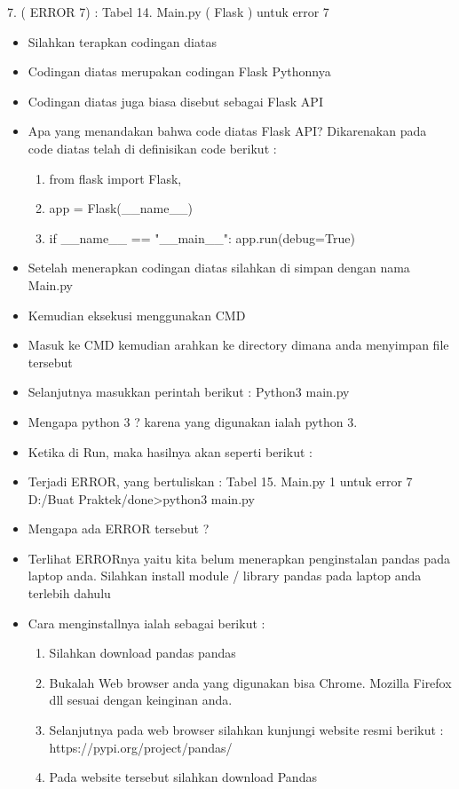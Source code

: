 7. ( ERROR 7) : 
Tabel 14. Main.py ( Flask ) untuk error 7 
\begin{itemize}
\item Silahkan terapkan codingan diatas 
\item Codingan diatas merupakan codingan Flask Pythonnya 
\item Codingan diatas juga biasa disebut sebagai Flask API 
\item Apa yang menandakan bahwa code diatas Flask API? Dikarenakan pada code diatas telah di definisikan code berikut :
\begin{enumerate}
\item from flask import Flask, 
\item app = Flask(\_\_name\_\_) 
\item if \_\_name\_\_ == "\_\_main\_\_": app.run(debug=True) 
\end{enumerate}
\item Setelah menerapkan codingan diatas silahkan di simpan dengan nama Main.py 
\item Kemudian eksekusi menggunakan CMD 
\item Masuk ke CMD kemudian arahkan ke directory dimana anda menyimpan file tersebut 
\item Selanjutnya masukkan perintah berikut : Python3 main.py 
\item Mengapa python 3 ? karena yang digunakan ialah python 3. 
\item Ketika di Run, maka hasilnya akan seperti berikut : 
\item Terjadi ERROR, yang bertuliskan : Tabel 15. Main.py 1 untuk error 7  D:/Buat Praktek/done>python3 main.py 
\item Mengapa ada ERROR tersebut ? 
\item Terlihat ERRORnya yaitu kita belum menerapkan penginstalan pandas pada laptop anda. Silahkan install module / library pandas pada laptop anda terlebih dahulu 
\item Cara menginstallnya ialah sebagai berikut : 
\begin{enumerate}
\item Silahkan download pandas pandas 
\item Bukalah Web browser anda yang digunakan bisa Chrome. Mozilla Firefox dll sesuai dengan keinginan anda. 
\item Selanjutnya pada web browser silahkan kunjungi website resmi berikut : https://pypi.org/project/pandas/ 
\item Pada website tersebut silahkan download Pandas 

\end{enumerate}
\end{itemize}
